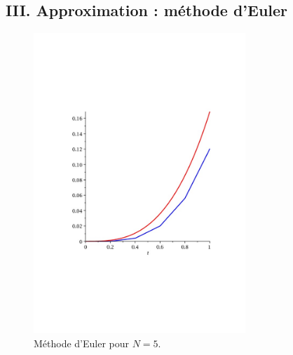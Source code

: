 \subsection*{III. Approximation : méthode d'Euler}
\begin{figure}[ht]
 \centering
 \includegraphics[width=8cm]{Eapprox1_2.pdf}
 \caption{Méthode d'Euler pour $N=5$.}
 \label{fig:Eapprox1_2}
\end{figure}

